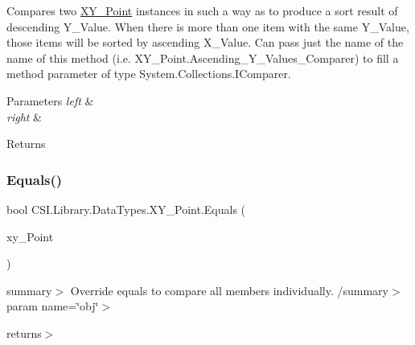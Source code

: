 Compares two \mbox{\hyperlink{struct_c_s_i_1_1_library_1_1_data_types_1_1_x_y___point}{X\+Y\+\_\+\+Point}} instances in such a way as to produce a sort result of descending Y\+\_\+\+Value. When there is more than one item with the same Y\+\_\+\+Value, those items will be sorted by ascending X\+\_\+\+Value. Can pass just the name of the name of this method (i.\+e. X\+Y\+\_\+\+Point.\+Ascending\+\_\+\+Y\+\_\+\+Values\+\_\+\+Comparer) to fill a method parameter of type System.\+Collections.\+I\+Comparer. 


\begin{DoxyParams}{Parameters}
{\em left} & \\
\hline
{\em right} & \\
\hline
\end{DoxyParams}
\begin{DoxyReturn}{Returns}

\end{DoxyReturn}
\mbox{\label{struct_c_s_i_1_1_library_1_1_data_types_1_1_x_y___point_ace282e3b909ff95bb8376516f05fff81}} 
\subsubsection{\texorpdfstring{Equals()}{Equals()}}
{\footnotesize\ttfamily bool C\+S\+I.\+Library.\+Data\+Types.\+X\+Y\+\_\+\+Point.\+Equals (\begin{DoxyParamCaption}\item[{\mbox{\hyperlink{struct_c_s_i_1_1_library_1_1_data_types_1_1_x_y___point}{X\+Y\+\_\+\+Point}}}]{xy\+\_\+\+Point }\end{DoxyParamCaption})\hspace{0.3cm}{\ttfamily [inline]}}

summary$>$ Override equals to compare all members individually. /summary$>$ param name=\char`\"{}obj\char`\"{}$>$

returns$>$\mbox{\label{struct_c_s_i_1_1_library_1_1_data_types_1_1_x_y___point_a5812c346cf3e51b228bb8b8a99837ba6}} 
